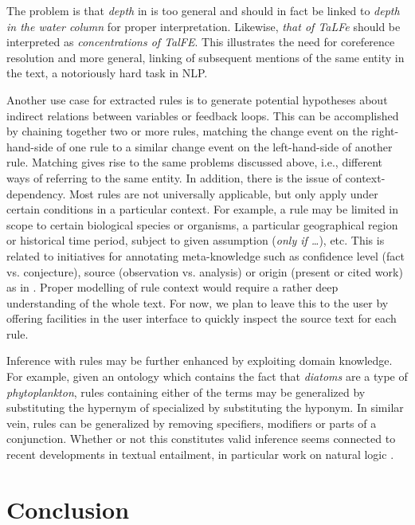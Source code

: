 \documentclass[10pt, a4paper]{article}
\begin{document}
The problem is that \emph{depth} in \Last[b] is too general and should in fact be linked to \emph{depth in the water column} for proper interpretation. 
Likewise, \emph{that of TaLFe} should be interpreted as \emph{concentrations of TalFE}.
This illustrates the need for coreference resolution and more general, linking of subsequent mentions of the same entity in the text, a notoriously hard task in NLP. 

Another use case for extracted rules is to generate potential hypotheses about indirect relations between variables or feedback loops.
This can be accomplished by chaining together two or more rules, matching the change event on the right-hand-side of one rule to a similar change event on the left-hand-side of another rule.
Matching gives rise to the same problems discussed above, i.e., different ways of referring to the same entity.
In addition, there is the issue of context-dependency.
Most rules are not universally applicable, but only apply under certain conditions in a particular context.
For example, a rule may be limited in scope to certain biological species or organisms, a particular geographical region or historical time period, subject to given assumption (\emph{only if \ldots}), etc.
This is related to initiatives for annotating meta-knowledge such as confidence level (fact vs. conjecture), source (observation vs. analysis) or origin (present or cited work) as in  \cite{Thompson2011Enriching}.  
Proper modelling of rule context would require a rather deep understanding of the whole text. 
For now, we plan to leave this to the user by offering facilities in the user interface to quickly inspect the source text for each rule.

Inference with rules may be further enhanced by exploiting domain knowledge.
For example, given an ontology which contains the fact that \emph{diatoms} are a type of \emph{phytoplankton}, rules containing either of the terms may be generalized by substituting the hypernym of specialized by substituting the hyponym.
In similar vein, rules can be generalized by removing specifiers, modifiers or parts of a conjunction.
Whether or not this constitutes valid inference seems connected to recent developments in textual entailment, in particular work on natural logic \cite{MacCartney2008Modeling}.
    

\section{Conclusion}
\label{sec:conclusion}
\end{document}
